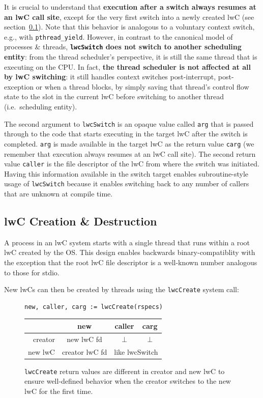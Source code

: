\documentclass[10pt,twocolumn,letter]{article}
\begin{document}
It is crucial to understand that \textbf{execution after a switch always resumes at an lwC call site}, except for the very first switch into a newly created lwC (see section~\ref{design:createdestroy}).
Note that this behavior is analogous to a voluntary context switch, e.g., with \lstinline{pthread_yield}.
However, in contrast to the canonical model of processes \& threads, \textbf{\lstinline{lwcSwitch} does not switch to another scheduling entity}:
from the thread scheduler's perspective, it is still the same thread that is executing on the CPU.
In fact, \textbf{the thread scheduler is not affected at all by lwC switching}:
it still handles context switches post-interrupt, post-exception or when a thread blocks, by simply saving that thread's control flow state to the slot in the current lwC before switching to another thread (i.e.~scheduling entity).

The second argument to \lstinline{lwcSwitch} is an opaque value called \lstinline{arg} that is passed through to the code that starts executing in the target lwC after the switch is completed.
\lstinline{arg} is made available in the target lwC as the return value \lstinline{carg} (we remember that execution always resumes at an lwC call site).
The second return value \lstinline{caller} is the file descriptor of the lwC from where the switch was initiated.
Having this information available in the switch target enables subroutine-style usage of \lstinline{lwcSwitch} because it enables switching back to any number of callers that are unknown at compile time.


\subsection{lwC Creation \& Destruction}\label{design:createdestroy}
A process in an lwC system starts with a single thread that runs within a root lwC created by the OS.
This design enables backwards binary-compatiblity with the exception that the root lwC file descriptor is a well-known number analogous to those for stdio.

New lwCs can then be created by threads using the \lstinline{lwcCreate} system call:

\begin{figure}[h]
  \centering
\begin{lstlisting}[mathescape]
  new, caller, carg := lwcCreate(rspecs)
\end{lstlisting}
\begin{tabular}{|r||c|c|c|}
  \hline
                &   new        & caller       & carg \\
  \hline\hline
  creator       & new lwC fd   & $\bot$      & $\bot$\\
  \hline
  new lwC       &    creator lwC fd   & \multicolumn{2}{c|}{like lwcSwitch}\\
  \hline
\end{tabular}
\caption{
  \texttt{lwcCreate} return values are different in creator and new lwC to ensure well-defined behavior when the creator switches to the new lwC for the first time.
}
\end{figure}
\end{document}
